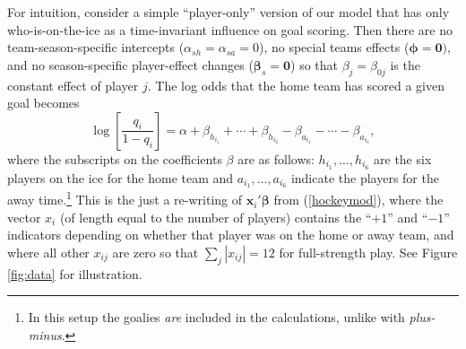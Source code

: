 For intuition, consider a simple ``player-only'' version of our model that has
only who-is-on-the-ice as a time-invariant influence on goal scoring.  Then
there are no team-season-specific intercepts ($\alpha_{sh}=\alpha_{sa}=0$), no
special teams effects ($\boldsymbol{\phi}=\mathbf{0})$, and no season-specific
player-effect changes ($\boldsymbol{\beta}_s = \mathbf{0}$)  so that $\beta_j
= \beta_{0j}$ is the constant effect of player $j$.  The log odds that the
home team has scored a given goal becomes \begin{equation} \log
\left[\frac{q_i}{1-q_i} \right]  = \alpha + \beta_{h_{i_1}} + \cdots +
\beta_{h_{i_6}} -  \beta_{a_{i_1}} - \cdots - \beta_{a_{i_6}},
\label{eq:simplemodel} \end{equation} where the subscripts on the coefficients
$\beta$ are as follows: $h_{i_1}, \dots, h_{i_6}$ are the six players on the
ice for the home team and  $a_{i_1}, \dots, a_{i_6}$ indicate the players for
the away time.\footnote{In this setup the goalies {\em are} included in the
calculations, unlike with {\em plus-minus}.}  This is the just a re-writing of
$\mathbf{x}_i'\boldsymbol{\beta}$ from (\ref{hockeymod}), where the vector
$x_i$ (of length equal to the number of players) contains the ``$+1$'' and
``$-1$'' indicators depending on whether that player was on the home or away
team, and where all other $x_{ij}$ are zero so that $\sum_j |x_{ij}| = 12$ for
full-strength play. See Figure \ref{fig:data} for illustration. 

